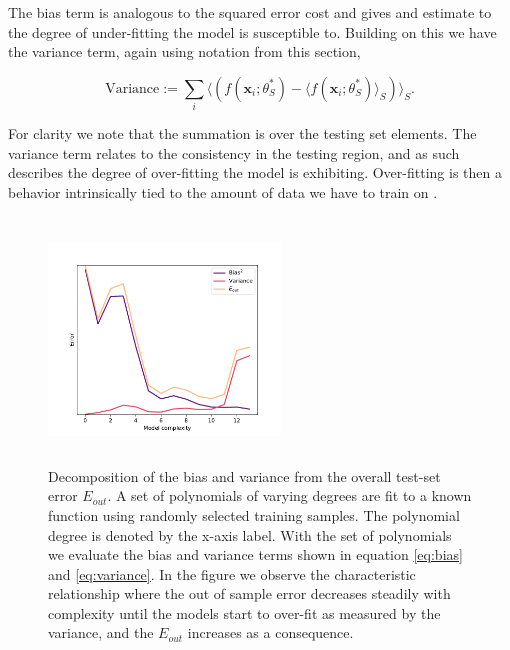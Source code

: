 \noindent The bias term is analogous to the squared error cost and gives and estimate to the degree of under-fitting the model is susceptible to. Building on this we have the variance term, again using notation from this section, 

\begin{equation}\label{eq:variance}
\text{Variance} := \sum_i \langle (f(\mathbf{x}_i; \theta^*_S) - \langle f(\mathbf{x}_i; \theta^*_S) \rangle_S)\rangle_S.
\end{equation}

\noindent For clarity we note that the summation is over the testing set elements. The variance term relates to the consistency in the testing region, and as such describes the degree of over-fitting the model is exhibiting. Over-fitting is then a behavior intrinsically tied to the amount of data we have to train on \cite{Mehta2019}. 

\begin{figure}
\centering
\includegraphics[width=0.55\textwidth, height=6.5cm]{../figures/bias_var_degree.pdf}
\caption[Bias-variance decomposition ]{Decomposition of the bias and variance from the overall test-set error $E_{out}$. A set of polynomials of varying degrees are fit to a known function using randomly selected training samples. The polynomial degree is denoted by the x-axis label. With the set of polynomials we evaluate the bias and variance terms shown in equation \ref{eq:bias} and \ref{eq:variance}. In the figure we observe the characteristic relationship where the out of sample error decreases steadily with complexity until the models start to over-fit as measured by the variance, and the $E_{out}$ increases as a consequence.}\label{fig:bv}
\end{figure}

